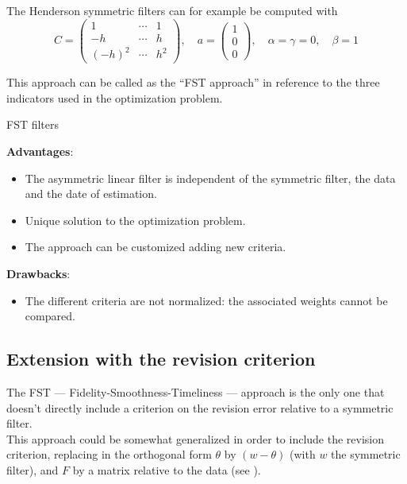 \documentclass[
  12pt,
  ,
  a4paper]{article}
\providecommand{\tightlist}{%
  \setlength{\itemsep}{0pt}\setlength{\parskip}{0pt}}
\newcommand\1{\mathds{1}}
\begin{document}
The Henderson symmetric filters can for example be computed with
\[C=\begin{pmatrix}
1 & \cdots&1\\
-h & \cdots&h \\
(-h)^2 & \cdots&h^2
\end{pmatrix},\quad
a=\begin{pmatrix}
1 \\0\\0
\end{pmatrix},\quad
\alpha=\gamma=0,\quad
\beta=1\]

This approach can be called as the ``FST approach'' in reference to the three indicators used in the optimization problem.

\begin{summary}{FST filters}

\textbf{Advantages}:

\begin{itemize}
\item
  The asymmetric linear filter is independent of the symmetric filter, the data and the date of estimation.
\item
  Unique solution to the optimization problem.
\item
  The approach can be customized adding new criteria.
\end{itemize}

\textbf{Drawbacks}:

\begin{itemize}
\tightlist
\item
  The different criteria are not normalized: the associated weights cannot be compared.
\end{itemize}

\end{summary}

\hypertarget{extension-with-the-revision-criterion}{%
\subsection{Extension with the revision criterion}\label{extension-with-the-revision-criterion}}

The FST --- Fidelity-Smoothness-Timeliness --- approach is the only one that doesn't directly include a criterion on the revision error relative to a symmetric filter.\\
This approach could be somewhat generalized in order to include the revision criterion, replacing in the orthogonal form \(\theta\) by \((w-\theta)\) (with \(w\) the symmetric filter), and \(F\) by a matrix relative to the data (see \textcite{ch12HBSA}).
\end{document}
